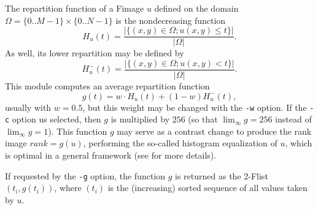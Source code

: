 The repartition function of a Fimage $u$ 
defined on the domain $\Omega=\{0..M-1\}\times\{0..N-1\}$ is
the nondecreasing function 
$$H_u(t) = \frac{|\{(x,y) \in \Omega;u(x,y)\leq t\}|}{|\Omega|}.$$
As well, its lower repartition may be defined by
$$H^-_u(t) = \frac{|\{(x,y) \in \Omega;u(x,y)< t\}|}{|\Omega|}.$$
This module computes an average repartition function
$$g(t) = w\cdot H_u(t)+ (1-w)H^-_u(t),$$
usually with $w=0.5$, but this weight may be changed with the \verb+-w+
option. If the \verb+-c+ option us selected, then $g$ is multiplied
by $256$ (so that $\lim_\infty g=256$ instead of $\lim_\infty g=1$). 
This function $g$ may serve as a contrast change to produce
the rank image $rank=g(u)$, performing the so-called histogram equalization
of $u$, which is optimal in a general framework
(see \cite{moisan:modelling} for more details). 

If requested by the \verb+-g+ option, the function $g$ is returned
as the 2-Flist $(t_i,g(t_i))$, where $(t_i)$ is the (increasing) sorted
sequence of all values taken by $u$.

